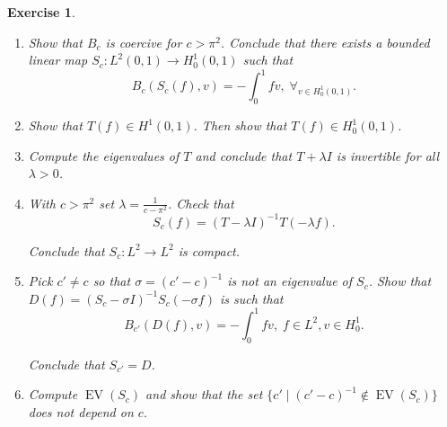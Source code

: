 \documentclass{article}
\newtheorem{ex}{Exercise}
\theoremstyle{nonumberplain}
\DeclareMathOperator{\EV}{\mathrm{EV}}
\begin{document}
\begin{ex}
\leavevmode
\begin{enumerate}
\item Show that $B_c$ is coercive for $c > \pi^2$. Conclude that there exists a bounded linear map $S_c \colon L^2(0,1) \to H^1_0(0,1)$ such that
\begin{equation}
B_c(S_c(f),v) = -\int_0^1 f v, \; \forall_{v \in H^1_0(0,1)}.
\end{equation}
\item Show that $T(f) \in H^1(0,1)$. Then show that $T(f) \in H^1_0(0,1)$.
\item Compute the eigenvalues of $T$ and conclude that $T+\lambda I$ is invertible for all $\lambda > 0$.
\item With $c > \pi^2$ set $\lambda = \frac1{c-\pi^2}$. Check that
\begin{equation}
S_c(f) = (T-\lambda I)^{-1} T(-\lambda f).
\end{equation}

Conclude that $S_c \colon L^2 \to L^2$ is compact.

\item Pick $c' \neq c$ so that $\sigma = (c' - c)^{-1}$ is not an eigenvalue of $S_c$. Show that $D(f) = (S_c - \sigma I)^{-1} S_c(-\sigma f)$ is such that
\begin{equation}
B_{c'}(D(f), v) = - \int_0^1 f v, \; f \in L^2, v \in H^1_0.
\end{equation}

Conclude that $S_{c'} = D$.

\item Compute $\EV(S_c)$ and show that the set $\{c' \mid (c'-c)^{-1} \notin \EV(S_c)\}$ does not depend on $c$.
\end{enumerate}
\end{ex}
\end{document}
